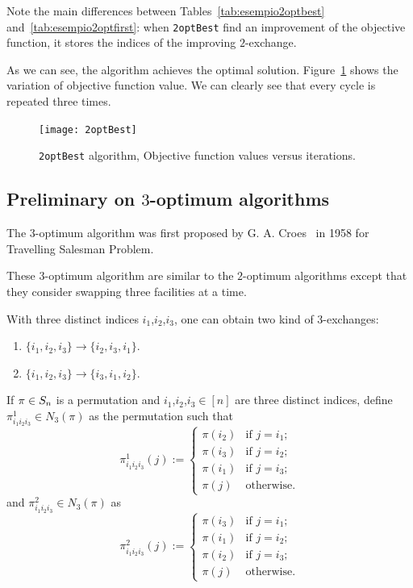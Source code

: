 	Note the main differences between Tables~\ref{tab:esempio2optbest} and~\ref{tab:esempio2optfirst}: when \texttt{2optBest} find an improvement of the objective function, it stores the indices of the improving $2$-exchange.  %

As we can see, the algorithm achieves the optimal solution.
Figure~\ref{fig:2optbest} shows the variation of objective function value. We can clearly see that every cycle is repeated three times.

\begin{figure}
	\centering
	\texttt{[image: 2optBest]}
	\caption{\texttt{2optBest} algorithm, Objective function values  versus iterations.}
	\label{fig:2optbest}
\end{figure}






\subsection{Preliminary on $3$-optimum algorithms}
\label{sec:Preliminary3Opt}

The  $3$-optimum  algorithm  was  first   proposed   by   G. A. Croes~\cite{Croes1958}  in 1958    for   Travelling   Salesman   Problem.

These $3$-optimum algorithm are similar to the $2$-optimum algorithms except that they consider swapping three facilities at a time.

With three distinct indices $i_1$,$i_2$,$i_3$, one can obtain two kind of $3$-exchanges:
\begin{enumerate}
	\item $\{i_1,i_2,i_3\}\to\{i_2,i_3,i_1\}$.
	\item $\{i_1,i_2,i_3\}\to\{i_3,i_1,i_2\}$.
\end{enumerate}
If $\pi \in S_n$ is a permutation and $i_1$,$i_2$,$i_3 \in [n]$ are three distinct indices, define $\pi^1_{i_1i_2i_3} \in  N_3(\pi)$ as the permutation such that
\begin{equation}
\label{eq:pi^1}
\pi^1_{i_1i_2i_3}(j):=
\begin{cases}
\pi(i_2) & \text{if $j = i_1$;}\\
\pi(i_3) & \text{if $j = i_2$;}\\
\pi(i_1) & \text{if $j = i_3$;}\\
\pi(j)   & \text{otherwise.}
\end{cases}
\end{equation}
and $\pi^2_{i_1i_2i_3} \in  N_3(\pi)$ as 
\begin{equation}
\label{eq:pi^2}
\pi^2_{i_1i_2i_3}(j):=
\begin{cases}
\pi(i_3) & \text{if $j = i_1$;}\\
\pi(i_1) & \text{if $j = i_2$;}\\
\pi(i_2) & \text{if $j = i_3$;}\\
\pi(j)   & \text{otherwise.}
\end{cases}
\end{equation}

